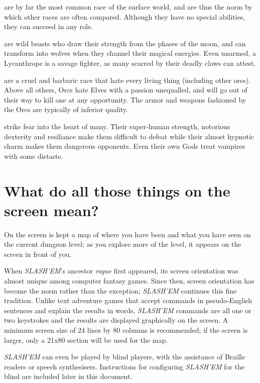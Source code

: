 \item[\bb{Humans}]%
are by far the most common race of the surface world, and
are thus the norm by which other races are often compared.  Although
they have no special abilities, they can succeed in any role.

\item[\bb{Lycanthropes}]%
are wild beasts who draw their strength from the phases
of the moon,  and can transform into wolves when they channel their magical
energies.  Even unarmed,  a Lycanthrope is a savage fighter,  as many
scarred by their deadly claws can attest.

\item[\bb{Orcs}]%
are a cruel and barbaric race that hate every living thing
(including other orcs).  Above all others, Orcs hate Elves with a passion
unequalled, and will go out of their way to kill one at any opportunity.
The armor and weapons fashioned by the Orcs are typically of inferior quality.

\item[\bb{Vampires}]%
strike fear into the heart of many. Their super-human strength,
notorious dexterity and resiliance make them difficult to defeat while their
almost hypnotic charm makes them dangerous opponents. Even their own Gods
treat vampires with some distaste.
\elist
\nd %
\section{What do all those things on the screen mean?}


On the screen is kept a map of where you have
been and what you have seen on the current dungeon level; as you
explore more of the level, it appears on the screen in front of you.

When {\it SLASH'EM\/}'s ancestor {\it rogue\/} first appeared, its screen
orientation was almost unique among computer fantasy games.  Since
then, screen orientation has become the norm rather than the
exception; {\it SLASH'EM\/} continues this fine tradition.  Unlike text
adventure games that accept commands in pseudo-English sentences and
explain the results in words, {\it SLASH'EM\/} commands are all one or two
keystrokes and the results are displayed graphically on the screen.  A
minimum screen size of 24 lines by 80 columns is recommended; if the
screen is larger, only a 21x80 section will be used for the map.

{\it SLASH'EM\/} can even be played by blind players, with the assistance of Braille
readers or speech synthesisers.  Instructions for configuring {\it SLASH'EM\/} for
the blind are included later in this document.

